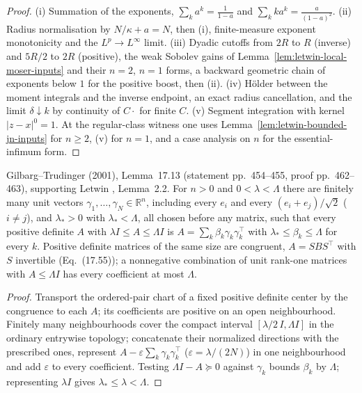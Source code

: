 \begin{proof}
  \leanok
  (i) Summation of the exponents, $\sum_ka^k=\frac1{1-a}$ and $\sum_kka^k=\frac{a}{(1-a)^2}$. (ii) Radius normalisation by
  $N/\kappa+a=N$, then (i), finite-measure exponent monotonicity and the $L^p\to L^\infty$ limit. (iii) Dyadic cutoffs from
  $2R$ to $R$ (inverse) and $5R/2$ to $2R$ (positive), the weak Sobolev gains of
  Lemma~\ref{lem:letwin-local-moser-inputs} and their $n=2$, $n=1$ forms, a backward geometric chain of exponents below $1$
  for the positive boost, then (ii). (iv) H\"older between the moment integrals and the inverse endpoint, an exact radius
  cancellation, and the limit $\delta\downarrow k$ by continuity of $C\cdot$ for finite $C$. (v) Segment integration with
  kernel $|z-x|^0=1$. At the regular-class witness one uses Lemma~\ref{lem:letwin-bounded-jn-inputs} for $n\ge2$, (v) for $n=1$, and a case
  analysis on $n$ for the essential-infimum form.
\end{proof}

\begin{lemma}
  \label{lem:gt-uniform-rank-one-frame}
  \leanok
  Gilbarg--Trudinger (2001), Lemma~17.13 (statement pp.~454--455, proof pp.~462--463), supporting Letwin
  \cite{Letwin2026QuadraticKLS}, Lemma~2.2. For $n>0$ and $0<\lambda<\Lambda$ there are finitely many unit vectors
  $\gamma_1,\dots,\gamma_N\in\mathbb R^n$, including every $e_i$ and every $(e_i+e_j)/\sqrt2$ ($i\ne j$), and $\lambda_*>0$
  with $\lambda_*<\Lambda$, all chosen before any matrix, such that every positive definite $A$ with
  $\lambda I\le A\le\Lambda I$ is $A=\sum_k\beta_k\gamma_k\gamma_k^{\top}$ with $\lambda_*\le\beta_k\le\Lambda$ for every $k$.
  Positive definite matrices of the same size are congruent, $A=SBS^{\top}$ with $S$ invertible (Eq.~(17.55)); a nonnegative
  combination of unit rank-one matrices with $A\le\Lambda I$ has every coefficient at most $\Lambda$.
\end{lemma}
\begin{proof}
  \leanok
  Transport the ordered-pair chart of a fixed positive definite center by the congruence to each $A$; its coefficients are
  positive on an open neighbourhood. Finitely many neighbourhoods cover the compact interval $[\lambda/2\,I,\Lambda I]$ in the
  ordinary entrywise topology; concatenate their normalized directions with the prescribed ones, represent
  $A-\varepsilon\sum_k\gamma_k\gamma_k^{\top}$ ($\varepsilon=\lambda/(2N)$) in one neighbourhood and add $\varepsilon$ to every
  coefficient. Testing $\Lambda I-A\succeq0$ against $\gamma_k$ bounds $\beta_k$ by $\Lambda$; representing $\lambda I$ gives
  $\lambda_*\le\lambda<\Lambda$.
\end{proof}

